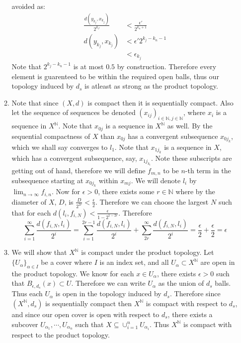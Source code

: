 \documentclass[12pt, letterpaper]{article}
\newcommand{\N}{\mathbb{N}}
\begin{document}
\begin{enumerate}
\begin{enumerate}
		avoided as: 
		\begin{align*}
		\frac{d(y_{k_j},x_{k_j})}{2^{k_J}} &< \frac{\epsilon'}{2^{k_n + 1}}\\
		d(y_{k_j},x_{k_j}) &< \epsilon' 2^{k_j - k_n - 1}\\
		&< \epsilon_{k_j}
		\end{align*}
		Note that $2^{k_j - k_n - 1}$ is at most $0.5$ by construction.  Therefore every 
		element is guarenteed to be within the required open balls, thus our topology 
		induced by $d_s$ is atleast as strong as the product topology.
		\item Note that since $(X,d)$ is compact then it is sequentially compact.  Also 
		let the sequence of sequences be denoted $(x_{i j})_{i \in \N, j \in \N}$, where
		$x_i$ is a sequence in $X^\N$.  Note that $x_{0j}$ is a sequence in $X^\N$ as 
		well.  By the sequential compactness of $X$ than $x_{0j}$ has a convergent 
		subsequence $x_{0j_{k}}$, which we shall say converges to $l_1$.  Note that 
		$x_{1j_{k}}$ is a sequence in $X$, which has a convergent subsequence, say,
		$x_{1j_{k_l}}$.  Note these subscripts are getting out of hand, therefore 
		we will define $f_{m,n}$ to be $n$-th term in the subsequence starting at 
		$x_{0j_{k}}$ within $x_{mj}$.  We will denote $l_i$ by $\lim_{n \to \infty}f_{i,n}$.  Now for $\epsilon > 0$, there exists some $r \in \N$ where by the diameter of 
		$X$, $D$, is $\frac{D}{2^{2r}} < \frac{\epsilon}{2}$.  Therefore we can choose
		the largest $N$ such that for each $d(l_i, f_{i,N}) < \frac{\epsilon}{1 - 2^{1 - 2r}}$.
		Therefore $$\sum_{i=1}^\infty \frac{d(f_{i,N},l_i)}{2^i} = \sum_{i=1}^{2r-1} \frac{d(f_{i,N},l_i)}{2^i} + \sum_{2r}^\infty\frac{d(f_{i,N},l_i)}{2^i} = \frac{\epsilon}{2} + \frac{\epsilon}{2}  = \epsilon$$
		\item We will show that $X^\N$ is compact under the product topology.  Let $\{U_\alpha\}_{\alpha \in I}$  be a cover where $I$ is an index set, and all $U_\alpha \subset X^\N$ are open in the product topology.  We know for each $x \in U_\alpha$, 
		there exists $\epsilon > 0$ such that $B_{\epsilon,d_s}(x) \subset U$.  
		Therefore we can write $U_\alpha$ as the union of $d_s$ balls.  Thus each
		$U_\alpha$ is open in the topology induced by $d_s$.  Therefore since $(X^\N, d_s)$ is sequentially compact then $X^\N$ is compact with respect to $d_s$, and since
		our open cover is open with respect to $d_s$, there exists a subcover 
		$U_{\alpha_1},\cdots, U_{\alpha_n}$ such that $X \subseteq \cup_{i = 1}^n U_{\alpha_i}$.  Thus $X^\N$ is compact with respect to the product topology.  

\end{enumerate}
\end{enumerate}
\end{document}
